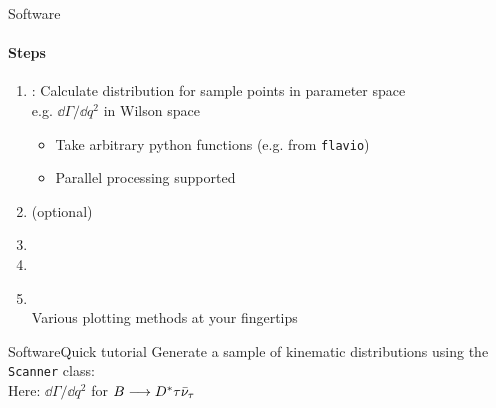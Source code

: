 \begin{frame}{Software}
    \framesubtitle{Steps}
    \begin{enumerate}
        \item<+-> : Calculate distribution for sample points in parameter space\\
        {\footnotesize e.g. $\dd\Gamma/\dd q^2$ in Wilson space}
        \begin{itemize}
            \item Take arbitrary python functions (e.g. from \texttt{flavio})
            \item Parallel processing supported
        \end{itemize}
        \item<+->  (optional)\\
        \item<+-> %
        \item<+-> %
        \item<+-> \\
        {\small Various plotting methods at your fingertips}
    \end{enumerate}
\end{frame}

\ifexamples
\begin{frame}[t, fragile]{Software}{Quick tutorial}
    Generate a sample of kinematic distributions using the \texttt{Scanner} class:\\
    {\footnotesize Here: $\dd\Gamma/\dd q^2$ for $B\longrightarrow D^*\tau\bar\nu_\tau$}
    

\end{frame}

